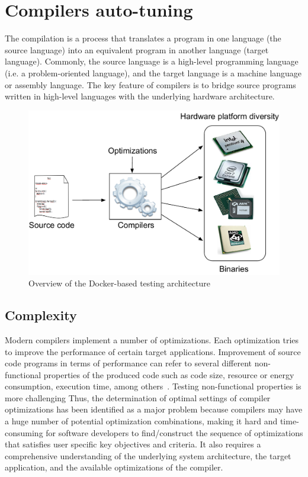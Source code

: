 \section{Compilers auto-tuning}
The compilation is a process that translates a program in one language (the source language) into an equivalent program in another language (target language). 
Commonly, the source language is a high-level programming language (i.e. a problem-oriented language), and the target language is a machine language or assembly language.
The key feature of compilers is to bridge source programs written in high-level languages with the underlying hardware architecture.
\begin{figure}[h]
	\center
	\includegraphics[scale=0.65]{Background/fig/hardware-diversity.pdf}
	\caption{Overview of the Docker-based testing architecture}
\end{figure}


\subsection{Complexity}
Modern compilers implement a number of optimizations. Each optimization tries to improve the performance of certain target applications. Improvement of source code programs in terms of performance can refer to several different non-functional properties of the produced code such as code size, resource or energy consumption, execution time, among others~\cite{almagor2004finding,pan2006fast}.
Testing non-functional properties is more challenging 
Thus, the determination of optimal settings of compiler optimizations has been identified as a major problem because compilers may have a huge number of potential optimization combinations, making it hard and time-consuming for software developers to find/construct the sequence of optimizations that satisfies user specific key objectives and criteria. It also requires a comprehensive understanding of the underlying system architecture, the target application, and the available optimizations of the compiler.




